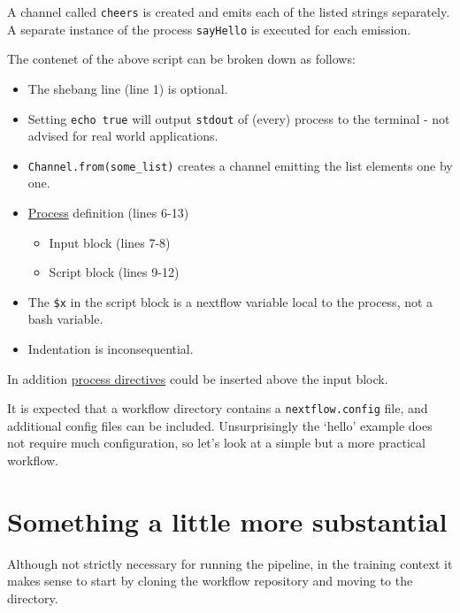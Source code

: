 A channel called \texttt{cheers} is created and emits each of the listed strings separately. 
A separate instance of the process \texttt{sayHello} is executed for each emission. 

\begin{note}
The contenet of the above script can be broken down as follows:
\begin{itemize}
  \item The shebang line (line 1) is optional.
  \item Setting \texttt{echo true} will output \texttt{stdout} of (every) process to the terminal - not advised for real world applications.
  \item \texttt{Channel.from(some\_list)} creates a channel emitting the list elements one by one.
  \item \href{https://www.nextflow.io/docs/latest/process.html}{Process} definition (lines 6-13)
  \begin{itemize}
    \item Input block (lines 7-8)
    \item Script block (lines 9-12)
  \end{itemize}
  \item The \texttt{\$x} in the script block is a nextflow variable local to the process, not a bash variable.
  \item Indentation is inconsequential. 
\end{itemize}
In addition \href{https://www.nextflow.io/docs/latest/process.html#directives}{process directives} could be inserted above the input block.
\end{note}


\begin{information}
It is expected that a workflow directory contains a \texttt{nextflow.config} file, and additional config files can be included. Unsurprisingly the `hello' example does not require much configuration, so let's look at a simple but a more practical workflow.
\end{information}

\section{Something a little more substantial}

Although not strictly necessary for running the pipeline, in the training context it makes sense to start by cloning the workflow repository and moving to the directory.


